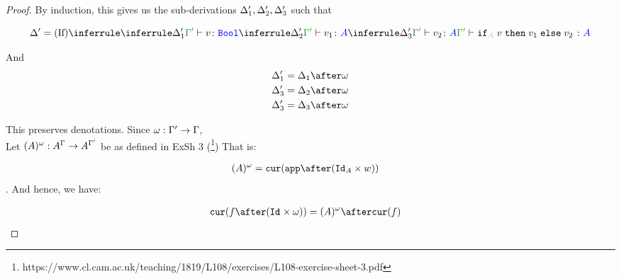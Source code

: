 \documentclass{report}
\begin{document}
\begin{framed}
\begin{proof}
        By induction, this gives us the sub-derivations $\Delta_1', \Delta_2', \Delta_3'$ such that
        
        \begin{equation}
            \D' = \ntreeruleIII{If}{
                \treeruleI{\D_1'}{\typerelation{\G'}{v}{\B}}
                }{
                \treeruleI{\D_2'}{\typerelation{\G'}{v_1}{ A}}
                }{
                \treeruleI{\D_3'}{\typerelation{\G'}{v_2}{ A}}
            }{
                \typerelation{\G'}{\pifthenelse{A}{v}{v_1}{v_2}}{ A}
            }
        \end{equation}
        
        And 
        \begin{align*}
            \D_1' & =\D_1 \after \w\\
            \D_3' & =\D_2 \after \w\\
            \D_3' & =\D_3 \after \w 
        \end{align*}
        
        
        This preserves denotations.
        Since $\omega: \Gamma' \rightarrow \Gamma$, \\
        Let $(A)^{\omega}: A^{\Gamma}\rightarrow A^{\Gamma'}$ be as defined in ExSh 3 (\footnote{https://www.cl.cam.ac.uk/teaching/1819/L108/exercises/L108-exercise-sheet-3.pdf})
        That is:
        
        \begin{align*}
            (A)^{\w} & = \cur{\app\after(\Id{A}\times w)}
        \end{align*}.
        And hence, we have:
        
        \begin{align*}
            \cur{f\after(\Id{}\times \w)} & = (A)^{\w} \after\cur{f}
        \end{align*}
        

\end{proof}
\end{framed}
\end{document}

